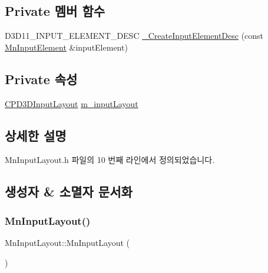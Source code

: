 \subsection*{Private 멤버 함수}
\begin{DoxyCompactItemize}
\item 
D3\+D11\+\_\+\+I\+N\+P\+U\+T\+\_\+\+E\+L\+E\+M\+E\+N\+T\+\_\+\+D\+E\+SC \hyperlink{class_m_n_l_1_1_mn_input_layout_a515d58b7d098fd375e54915392ae2f63}{\+\_\+\+Create\+Input\+Element\+Desc} (const \hyperlink{class_m_n_l_1_1_mn_input_element}{Mn\+Input\+Element} \&input\+Element)
\end{DoxyCompactItemize}
\subsection*{Private 속성}
\begin{DoxyCompactItemize}
\item 
\hyperlink{namespace_m_n_l_aec7a2a132d6e72492d5feb5926d838dd}{C\+P\+D3\+D\+Input\+Layout} \hyperlink{class_m_n_l_1_1_mn_input_layout_aa22d16128ed283827f88cd87044fcb36}{m\+\_\+input\+Layout}
\end{DoxyCompactItemize}


\subsection{상세한 설명}


Mn\+Input\+Layout.\+h 파일의 10 번째 라인에서 정의되었습니다.



\subsection{생성자 \& 소멸자 문서화}
\mbox{\label{class_m_n_l_1_1_mn_input_layout_a937cd608980a37244885b81118c83a9a}} 
\subsubsection{\texorpdfstring{Mn\+Input\+Layout()}{MnInputLayout()}}
{\footnotesize\ttfamily Mn\+Input\+Layout\+::\+Mn\+Input\+Layout (\begin{DoxyParamCaption}{ }\end{DoxyParamCaption})}



